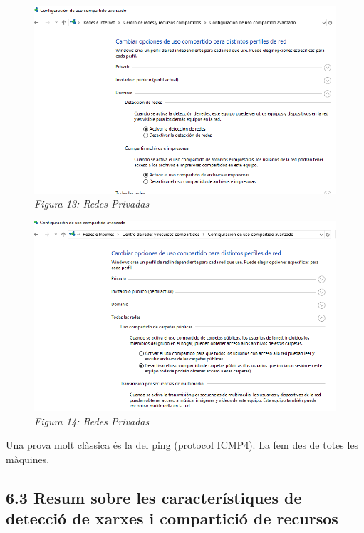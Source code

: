 \documentclass[
  a4paper,
]{article}
\begin{document}
\begin{figure}
\centering
\includegraphics{png/OpcionesDeteccionRedesDominio.png}
\caption{\emph{Figura 13: Redes Privadas}}
\end{figure}

\begin{figure}
\centering
\includegraphics{png/OpcionesDeteccionRedesTodas.png}
\caption{\emph{Figura 14: Redes Privadas}}
\end{figure}

Una prova molt clàssica és la del ping (protocol ICMP4). La fem des de
totes les màquines.

\subsection{6.3 Resum sobre les característiques de detecció de xarxes i
compartició de
recursos}\label{resum-sobre-les-caracteruxedstiques-de-detecciuxf3-de-xarxes-i-comparticiuxf3-de-recursos}
\end{document}
